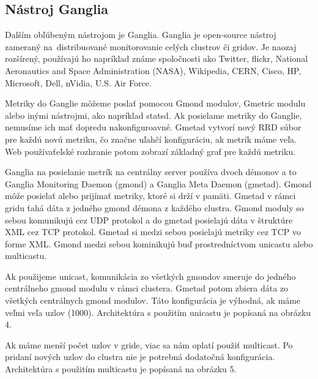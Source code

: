 \documentclass[a4paper, usesections, upjsfrontpage, thesismargins, thesislinespacing, twoside]{rnthesissvk}
\begin{document}
\subsection{Nástroj Ganglia}

Dalším obľúbeným nástrojom je Ganglia.
Ganglia je open-source nástroj zameraný na~distribuované monitorovanie celých clustrov či gridov.
Je naozaj rozšírený, používajú ho napríklad známe spoločnosti ako Twitter, flickr, National Aeronautics and Space Administration (NASA), Wikipedia, CERN, Cisco, HP, Microsoft, Dell, nVidia, U.S. Air Force.

Metriky do Ganglie môžeme poslať pomocou Gmond modulov, Gmetric modulu alebo inými nástrojmi, ako napríklad statsd.
Ak posielame metriky do Ganglie, nemusíme ich mať dopredu nakonfiguroavné.
Gmetad vytvorí nový RRD súbor pre každú novú metriku, čo značne uľahčí konfiguráciu, ak metrík máme veľa.
Web používaťeľské rozhranie potom zobrazí základný graf pre každú metriku.

Ganglia na posielanie metrík na centrálny server používa dvoch démonov a to Ganglia Monitoring Daemon (gmond) a Ganglia Meta Daemon (gmetad).
Gmond môže posielať alebo prijímať metriky, ktoré si drží v pamäti.
Gmetad v rámci gridu ťahá dáta z jedného gmond démona z každého clustra.
Gmond moduly so sebou komunikujú cez UDP protokol a do gmetad posielajú dáta v štruktúre XML cez TCP protokol.
Gmetad si medzi sebou posielajú metriky cez TCP vo forme XML.
Gmond medzi sebou kominikujú buď prostredníctvom unicastu alebo multicastu.

Ak použijeme unicast, komunikácia zo všetkých gmondov smeruje do jedného centrálneho gmond modulu v rámci clustera.
Gmetad potom zbiera dáta zo všetkých centrálnych gmond modulov.
Táto konfigurácia je výhodná, ak máme veľmi veľa uzlov (1000).
Architektúra s použitím unicastu je popísaná na obrázku 4.

Ak máme menší počet uzlov v gride, viac sa nám oplatí použiť multicast.
Po pridaní nových uzlov do clustra nie je potrebná dodatočná konfigurácia.
Architektúra s použitím multicastu je popísaná na obrázku 5.
\end{document}
